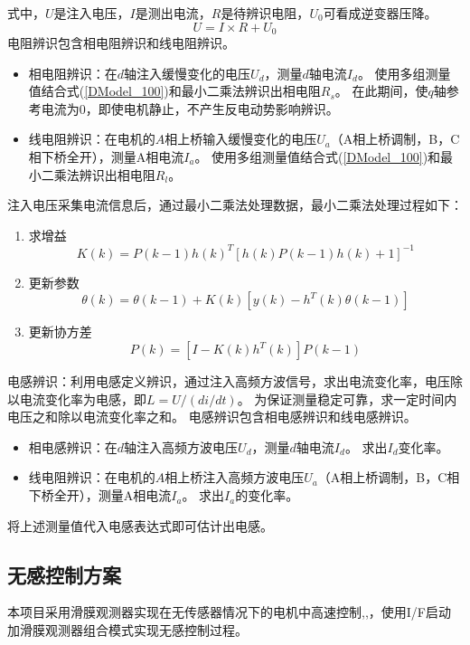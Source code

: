 ﻿\documentclass[12pt,a4paper]{article}
\begin{document}
式中，$U$是注入电压，$I$是测出电流，$R$是待辨识电阻，$U_0$可看成逆变器压降。
\begin{equation}
  \label{DModel_100}
  U=I\times R+U_0
\end{equation}
电阻辨识包含相电阻辨识和线电阻辨识。
\begin{itemize}
  \item 相电阻辨识：在$d$轴注入缓慢变化的电压$U_d$，测量$d$轴电流$I_d$。
        使用多组测量值结合式(\ref{DModel_100})和最小二乘法辨识出相电阻$R_s$。
        在此期间，使$q$轴参考电流为0，即使电机静止，不产生反电动势影响辨识。
  \item 线电阻辨识：在电机的$A$相上桥输入缓慢变化的电压$U_a$（A相上桥调制，B，C相下桥全开），测量A相电流$I_a$。
        使用多组测量值结合式(\ref{DModel_100})和最小二乘法辨识出相电阻$R_l$。
\end{itemize}
注入电压采集电流信息后，通过最小二乘法处理数据，最小二乘法处理过程如下：
\begin{enumerate}
  \item 求增益
        \begin{equation}
          K(k)=P(k-1)h(k)^T[h(k)P(k-1)h(k)+1]^{-1}
        \end{equation}
  \item 更新参数
        \begin{equation}
          \theta(k)=\theta(k-1)+K(k)[y(k)-h^{T}(k)\theta(k-1)]
        \end{equation}
  \item 更新协方差
        \begin{equation}
          P(k)=[I-K(k)h^T(k)]P(k-1)
        \end{equation}


\end{enumerate}

电感辨识：利用电感定义辨识，通过注入高频方波信号，求出电流变化率，电压除以电流变化率为电感，即$L=U/(di/dt)$。
为保证测量稳定可靠，求一定时间内电压之和除以电流变化率之和。
电感辨识包含相电感辨识和线电感辨识。
\begin{itemize}
  \item 相电感辨识：在$d$轴注入高频方波电压$U_d$，测量$d$轴电流$I_d$。
        求出$I_d$变化率。
  \item 线电阻辨识：在电机的$A$相上桥注入高频方波电压$U_a$（A相上桥调制，B，C相下桥全开），测量A相电流$I_a$。
        求出$I_a$的变化率。
\end{itemize}
将上述测量值代入电感表达式即可估计出电感。


\subsection{无感控制方案}
本项目采用滑膜观测器实现在无传感器情况下的电机中高速控制\cite{Sul2017a},\cite{Sul2012},\cite{JunggiLee2010}，使用I/F启动加滑膜观测器组合模式实现无感控制过程。
\end{document}
